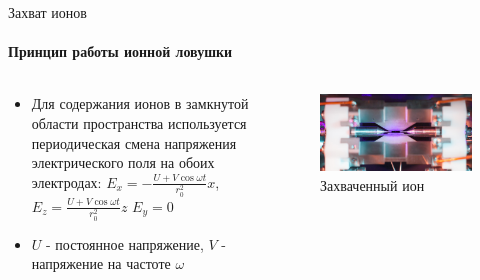 \documentclass{beamer}
\begin{document}
    \begin{frame}{Захват ионов}
    \framesubtitle{Принцип работы ионной ловушки}

        \begin{columns}

        \begin{column}{0.5\textwidth}

            \begin{itemize}
                \item<2-> Для содержания ионов в замкнутой области пространства используется
                      периодическая смена напряжения электрического поля на обоих электродах:
                      $E_x = - \frac{U + V \cos{\omega t}}{r_{0}^2} x$,
                      $E_z = \frac{U + V \cos{\omega t}}{r_{0}^2} z$
                      $E_y = 0$
                \item<2-> $U$ - постоянное напряжение, $V$ - напряжение на частоте $\omega$
            \end{itemize}

        \end{column}

        \begin{column}{0.5\textwidth}
            \begin{figure}
                \centering
                \includegraphics[width=\textwidth]{media/trapped-ion.jpg}
                \caption{Захваченный ион}
            \end{figure}
        \end{column}

        \end{columns}
    \end{frame}
\end{document}
